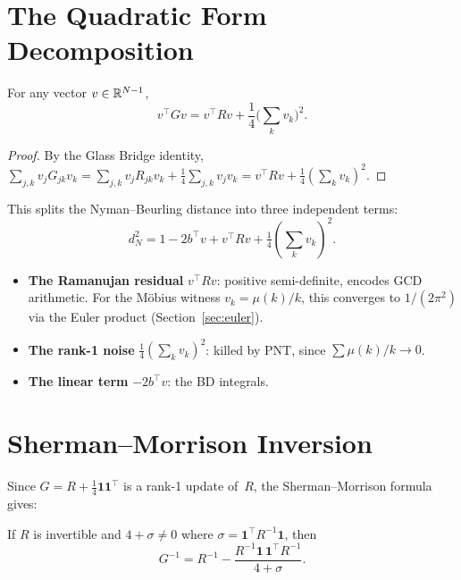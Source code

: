 \documentclass[11pt,a4paper]{article}
\begin{document}
\section{The Quadratic Form Decomposition}
\label{sec:quadform}

\begin{theorem}
\label{thm:quadform}
For any vector $v \in \mathbb{R}^{N-1}$,
\[
  v^\top G v = v^\top R v
    + \frac{1}{4}\bigl(\textstyle\sum_k v_k\bigr)^2.
\]
\end{theorem}

\begin{proof}
By the Glass Bridge identity,
$\sum_{j,k} v_j G_{jk} v_k
= \sum_{j,k} v_j R_{jk} v_k + \frac{1}{4} \sum_{j,k} v_j v_k
= v^\top R v + \frac{1}{4}(\sum_k v_k)^2$.
\end{proof}

This splits the Nyman--Beurling distance into three independent
terms:
\begin{equation}
\label{eq:three-terms}
  d_N^2 = 1 - 2b^\top v + v^\top R v
    + \tfrac{1}{4}(\textstyle\sum_k v_k)^2.
\end{equation}

\begin{itemize}
  \item \textbf{The Ramanujan residual} $v^\top R v$: positive
    semi-definite, encodes GCD arithmetic. For the M\"obius witness
    $v_k = \mu(k)/k$, this converges to $1/(2\pi^2)$ via the Euler
    product (Section~\ref{sec:euler}).
  \item \textbf{The rank-1 noise}
    $\frac{1}{4}(\sum_k v_k)^2$: killed by PNT, since
    $\sum \mu(k)/k \to 0$.
  \item \textbf{The linear term} $-2b^\top v$: the BD integrals.
\end{itemize}

\section{Sherman--Morrison Inversion}
\label{sec:sm}

Since $G = R + \frac{1}{4}\mathbf{1}\mathbf{1}^\top$ is a rank-1
update of~$R$, the Sherman--Morrison formula gives:

\begin{theorem}
\label{thm:sm}
If $R$ is invertible and $4 + \sigma \neq 0$ where
$\sigma = \mathbf{1}^\top R^{-1} \mathbf{1}$, then
\[
  G^{-1} = R^{-1}
    - \frac{R^{-1} \mathbf{1}\,\mathbf{1}^\top R^{-1}}
      {4 + \sigma}.
\]
\end{theorem}
\end{document}
